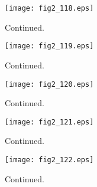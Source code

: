 \documentclass[preprint]{aastex}
\begin{document}
\setcounter{figure}{1}
\begin{figure}[t]
\centering
\texttt{[image: fig2\_118.eps]}
\caption{
Continued. 
}
\label{Fig2}
\end{figure}
\clearpage



\setcounter{figure}{1}
\begin{figure}[t]
\centering
\texttt{[image: fig2\_119.eps]}
\caption{
Continued. 
}
\label{Fig2}
\end{figure}
\clearpage



\setcounter{figure}{1}
\begin{figure}[t]
\centering
\texttt{[image: fig2\_120.eps]}
\caption{
Continued. 
}
\label{Fig2}
\end{figure}
\clearpage



\setcounter{figure}{1}
\begin{figure}[t]
\centering
\texttt{[image: fig2\_121.eps]}
\caption{
Continued. 
}
\label{Fig2}
\end{figure}
\clearpage



\setcounter{figure}{1}
\begin{figure}[t]
\centering
\texttt{[image: fig2\_122.eps]}
\caption{
Continued. 
}
\label{Fig2}
\end{figure}
\clearpage
\end{document}
